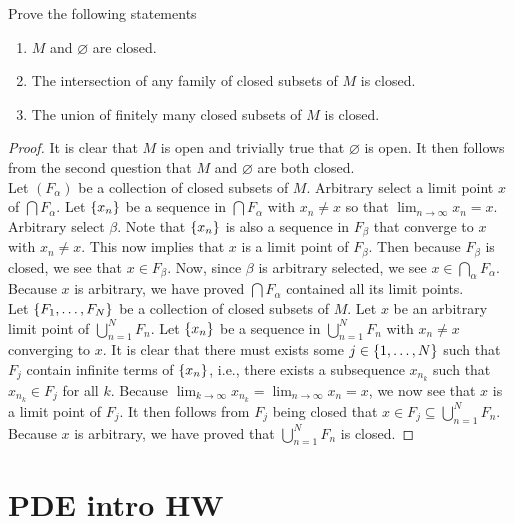 \documentclass{report}
\begin{document}
\begin{question}{}{}
Prove the following statements 
\begin{enumerate}[label=(\alph*)]
  \item $M$ and $\varnothing$ are closed. 
  \item The intersection of any family of closed subsets of $M$ is closed.  
  \item The union of finitely many closed subsets of $M$ is closed.
\end{enumerate}
\end{question}
\begin{proof}
It is clear that $M$ is open and trivially true that $\varnothing$ is open. It then follows from the second question that $M$ and  $\varnothing$ are both closed. \\

Let $(F_\alpha )$ be a collection of closed subsets of $M$. Arbitrary select a limit point $x$ of  $\bigcap  F_\alpha $. Let $\{ x_n \}$ be a sequence in $\bigcap F_\alpha $ with $x_n\neq x$ so that $\lim_{n\to \infty}x_n=x$. Arbitrary select $\beta $. Note that $\{ x_n \}$ is also a sequence in $F_\beta  $ that converge to  $x$ with $x_n\neq x$. This now implies that $x$ is a limit point of $F_\beta  $. Then because $F_\beta  $ is closed, we see that $x\in F_\beta$. Now, since  $\beta $ is arbitrary selected, we see $x\in \bigcap_\alpha F_\alpha $. Because $x$ is arbitrary, we have proved $\bigcap F_\alpha $ contained all its limit points.\\

Let $\{ F_1,\dots ,F_N \}$ be a collection of closed subsets of $M$.  Let $x$ be an arbitrary limit point of $\bigcup_{n=1}^N F_n$. Let $\{ x_n \}$ be a sequence in $\bigcup_{n=1}^N F_n$ with $x_n\neq x$ converging to $x$. It is clear that there must exists some $j \in \{ 1,\dots ,N \}$  such that $F_j$ contain infinite terms of $\{ x_n \}$, i.e., there exists a subsequence $x_{n_k}$ such that $x_{n_k} \in F_j$ for all $k$. Because  $\lim_{k\to \infty}x_{n_k}=\lim_{n\to \infty}x_n=x$, we now see that $x$ is a limit point of  $F_j$. It then follows from  $F_j$ being closed that $x\in F_j \subseteq\bigcup_{n=1}^N F_n$. Because $x$ is arbitrary, we have proved that $\bigcup_{n=1}^N F_n$ is closed.
\end{proof}
\chapter{PDE intro HW}
\end{document}
